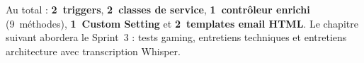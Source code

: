 \medskip

Au total : \textbf{2~triggers}, \textbf{2~classes de service}, \textbf{1~contrôleur enrichi} (9~méthodes), \textbf{1~Custom Setting} et \textbf{2~templates email HTML}. Le chapitre suivant abordera le Sprint~3 : tests gaming, entretiens techniques et entretiens architecture avec transcription Whisper.

